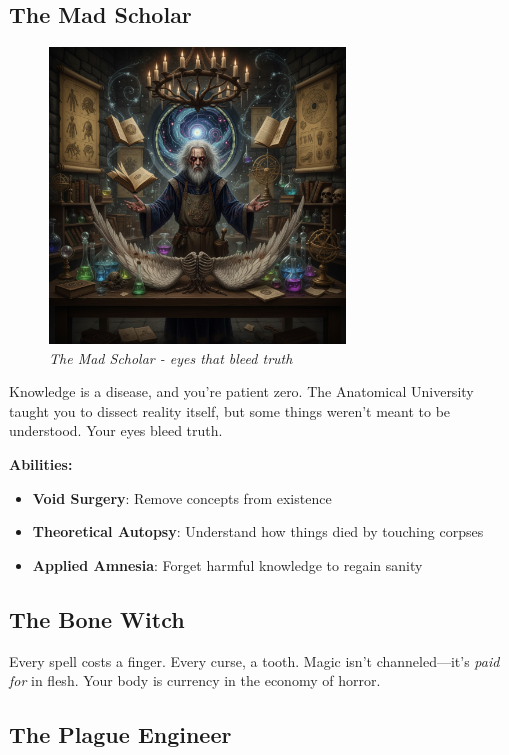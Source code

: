 \documentclass[11pt,a4paper,twoside]{book}
\begin{document}
\subsection{The Mad Scholar}

\begin{figure}[h]
\centering
\includegraphics[width=0.7\textwidth]{images/mad_scholar_2025-09-03T22-30-39-545Z_1.png}
\caption*{\textit{The Mad Scholar - eyes that bleed truth}}
\end{figure}

Knowledge is a disease, and you're patient zero. The Anatomical University taught you to dissect reality itself, but some things weren't meant to be understood. Your eyes bleed truth.

\textbf{Abilities:}
\begin{itemize}
    \item \textbf{Void Surgery}: Remove concepts from existence
    \item \textbf{Theoretical Autopsy}: Understand how things died by touching corpses
    \item \textbf{Applied Amnesia}: Forget harmful knowledge to regain sanity
\end{itemize}

\subsection{The Bone Witch}

Every spell costs a finger. Every curse, a tooth. Magic isn't channeled—it's \textit{paid for} in flesh. Your body is currency in the economy of horror.

\subsection{The Plague Engineer}
\end{document}
